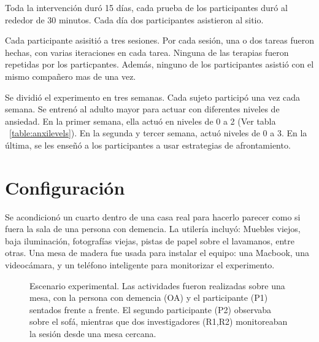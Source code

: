 Toda la intervenci\'on dur\'o 15 d\'ias, cada prueba de los participantes dur\'o al rededor de 30 minutos. Cada d\'ia dos participantes asistieron al sitio.

Cada participante asisiti\'o a tres sesiones. Por cada sesi\'on, una o dos tareas fueron hechas, con varias iteraciones en cada tarea. Ninguna de las terapias fueron repetidas por los particpantes. Adem\'as, ninguno de los participantes asisti\'o con el mismo compa\~nero mas de una vez.

Se dividi\'o el experimento en tres semanas. Cada sujeto particip\'o una vez cada semana. Se entren\'o al adulto mayor para actuar con diferentes niveles de ansiedad. En la primer semana, ella actu\'o en niveles de 0 a 2 (Ver tabla ~\ref{table:anxilevels}). En la segunda y tercer semana, actu\'o niveles de 0 a 3. En la \'ultima, se les ense\~n\'o a los participantes a usar estrategias de afrontamiento.
\section{Configuraci\'on}\label{secc:setup}
	Se acondicion\'o un cuarto dentro de una casa real para hacerlo parecer como si fuera la sala de una persona con demencia. La utiler\'ia incluy\'o: Muebles viejos, baja iluminaci\'on, fotograf\'ias viejas, pistas de papel sobre el lavamanos, entre otras. Una mesa de madera fue usada para instalar el equipo: una Macbook, una videoc\'amara, y un tel\'efono inteligente para monitorizar el experimento.
\begin{figure}[h]
        \centering
        \caption{Escenario experimental. Las actividades fueron realizadas sobre una mesa, con la persona con demencia (OA) y el participante (P1) sentados frente a frente. El segundo participante (P2) observaba sobre el sof\'a, mientras que dos investigadores (R1,R2) monitoreaban la sesi\'on desde una mesa cercana.} \label{fig:img_exp_setup}
\end{figure}


